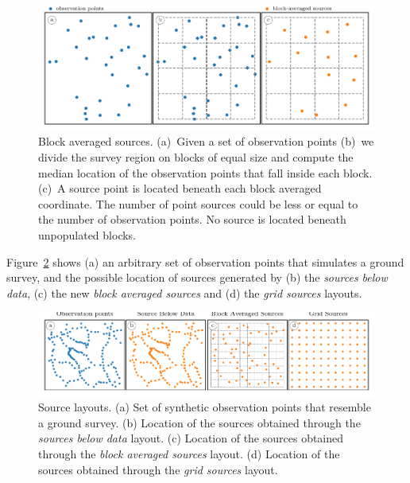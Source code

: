 \documentclass[twocolumn]{article}
\begin{document}

\begin{figure}
    \includegraphics[width=\linewidth]{figs/block-averaged-sources-schematics.pdf}
    \caption{
        Block averaged sources.
        (a)~Given a set of observation points
        (b)~we divide the survey region on blocks of equal size and compute the
            median location of the observation points that fall inside each
            block.
        (c)~A source point is located beneath each block averaged coordinate.
            The number of point sources could be less or equal to the number of
            observation points. No source is located beneath unpopulated
            blocks.
    }
    \label{fig:block-averaged-sources}
\end{figure}

Figure~\ref{fig:source-layouts-schematics} shows (a) an arbitrary set of
observation points that simulates a ground survey, and the possible location of
sources generated by (b) the \emph{sources below data}, (c) the new \emph{block
averaged sources} and (d) the \emph{grid sources} layouts.

\begin{figure}
    \includegraphics[width=\linewidth]{figs/source-layouts-schematics.pdf}
    \caption{
        Source layouts.
        (a) Set of \SourceLayoutsSchematicsObservations{} synthetic observation
            points that resemble a ground survey.
        (b) Location of the \SourceLayoutsSchematicsSourceBelowData{} sources
            obtained through the \emph{sources below data} layout.
        (c) Location of the \SourceLayoutsSchematicsBlockAveragedSources{}
            sources obtained through the \emph{block averaged sources} layout.
        (d) Location of the \SourceLayoutsSchematicsGridSources{} sources
            obtained through the \emph{grid sources} layout.
    }
    \label{fig:source-layouts-schematics}
\end{figure}
\end{document}
